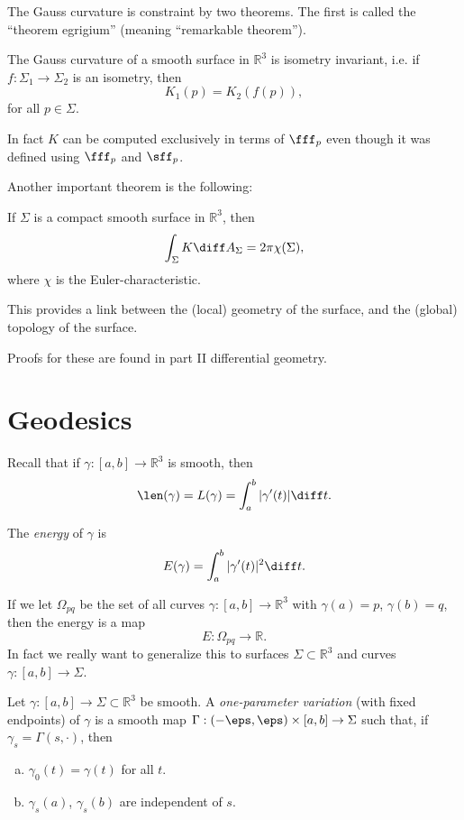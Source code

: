 \documentclass[12pt]{article}
\begin{document}

The Gauss curvature is constraint by two theorems. The first is called the ``theorem egrigium'' (meaning ``remarkable theorem'').

\begin{theorem}
	The Gauss curvature of a smooth surface in $\mathbb{R}^3$ is isometry invariant, i.e. if $f: \Sigma_1 \to \Sigma_2$ is an isometry, then
	\[
	K_1(p) = K_2(f(p)),
	\]
	for all $p \in \Sigma$.

	In fact $K$ can be computed exclusively in terms of $\fff_p$ even though it was defined using $\fff_p$ and $\sff_p$.
\end{theorem}

Another important theorem is the following:

\begin{theorem}
	If $\Sigma$ is a compact smooth surface in $\mathbb{R}^3$, then
	\[
	\int_{\Sigma} K \diff A_{\Sigma} = 2 \pi \chi(\Sigma),
	\]
	where $\chi$ is the Euler-characteristic.
\end{theorem}

This provides a link between the (local) geometry of the surface, and the (global) topology of the surface.

Proofs for these are found in part II differential geometry.

\newpage

\section{Geodesics}
\label{sec:geodesics}

Recall that if $\gamma : [a, b] \to \mathbb{R}^3$ is smooth, then
\[
\len(\gamma) = L(\gamma) = \int_{a}^{b} |\gamma'(t)| \diff t.
\]
\begin{definition}
	The \emph{energy} of $\gamma$ is
	\[
	E(\gamma) = \int_{a}^{b} |\gamma'(t)|^2 \diff t.
	\]
\end{definition}

If we let $\Omega_{pq}$ be the set of all curves $\gamma : [a, b] \to \mathbb{R}^3$ with $\gamma(a) = p$, $\gamma(b) = q$, then the energy is a map
\[
E : \Omega_{pq} \to \mathbb{R}.
\]
In fact we really want to generalize this to surfaces $\Sigma \subset \mathbb{R}^3$ and curves $\gamma : [a, b] \to \Sigma$.

\begin{definition}
	Let $\gamma : [a, b] \to \Sigma \subset \mathbb{R}^3$ be smooth. A \emph{one-parameter variation} (with fixed endpoints) of $\gamma$ is a smooth map $\Gamma : (-\eps, \eps) \times [a, b] \to \Sigma$ such that, if $\gamma_s = \Gamma(s, \cdot)$, then
	\begin{enumerate}[(a)]
		\item $\gamma_0(t) = \gamma(t)$ for all $t$.
		\item $\gamma_s(a)$, $\gamma_s(b)$ are independent of $s$.
	\end{enumerate}
\end{definition}
\end{document}
